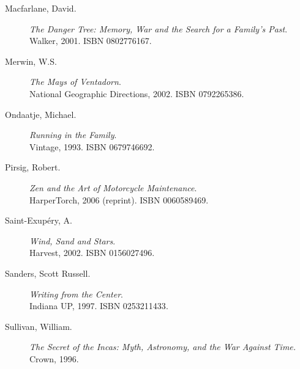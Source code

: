 \documentclass[letterpaper,10pt,headsepline]{scrreprt}
\begin{document}
\begin{description}
\item [Macfarlane, David.] \textit{The Danger Tree: Memory, War and
    the Search for a Family's Past}. \\Walker, 2001. \textsc{ISBN
    0802776167}.
\item [Merwin, W.S.] \textit{The Mays of Ventadorn}. \\National
  Geographic Directions, 2002. \textsc{ISBN 0792265386}.
\item [Ondaatje, Michael.] \textit{Running in the Family}. \\Vintage,
  1993. \textsc{ISBN 0679746692}.
\item [Pirsig, Robert.] \textit{Zen and the Art of Motorcycle
    Maintenance}. \\HarperTorch, 2006 (reprint). \textsc{ISBN
    0060589469}.
\item [Saint-Exup\'ery, A.] \textit{Wind, Sand and Stars}. \\Harvest,
  2002. \textsc{ISBN 0156027496}.
\item [Sanders, Scott Russell.] \textit{Writing from the Center}.
  \\Indiana UP, 1997. \textsc{ISBN 0253211433}.
\item [Sullivan, William.] \textit{The Secret of the Incas: Myth,
    Astronomy, and the War Against Time.} \\Crown, 1996.
\end{description}
\end{document}
